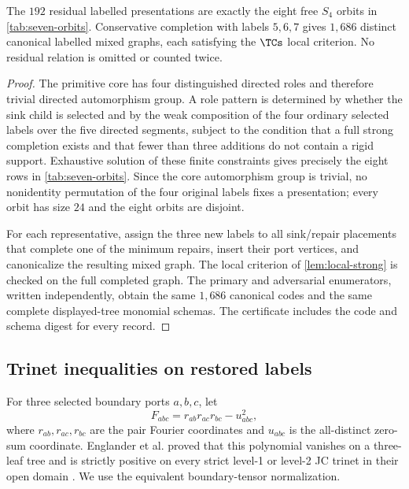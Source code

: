 \begin{proposition}\label{prop:seven-universe}
The $192$ residual labelled presentations are exactly the eight free $S_4$ orbits in \cref{tab:seven-orbits}.  Conservative completion with labels $5,6,7$ gives $1{,}686$ distinct canonical labelled mixed graphs, each satisfying the $\TCs$ local criterion.  No residual relation is omitted or counted twice.
\end{proposition}

\begin{proof}
The primitive core has four distinguished directed roles and therefore trivial directed automorphism group.  A role pattern is determined by whether the sink child is selected and by the weak composition of the four ordinary selected labels over the five directed segments, subject to the condition that a full strong completion exists and that fewer than three additions do not contain a rigid support.  Exhaustive solution of these finite constraints gives precisely the eight rows in \cref{tab:seven-orbits}.  Since the core automorphism group is trivial, no nonidentity permutation of the four original labels fixes a presentation; every orbit has size $24$ and the eight orbits are disjoint.

For each representative, assign the three new labels to all sink/repair placements that complete one of the minimum repairs, insert their port vertices, and canonicalize the resulting mixed graph.  The local criterion of \cref{lem:local-strong} is checked on the full completed graph.  The primary and adversarial enumerators, written independently, obtain the same $1{,}686$ canonical codes and the same complete displayed-tree monomial schemas.  The certificate includes the code and schema digest for every record.
\end{proof}

\subsection{Trinet inequalities on restored labels}

For three selected boundary ports $a,b,c$, let
\begin{equation}\label{eq:Fabc}
F_{abc}=r_{ab}r_{ac}r_{bc}-u_{abc}^2,
\end{equation}
where $r_{ab},r_{ac},r_{bc}$ are the pair Fourier coordinates and $u_{abc}$ is the all-distinct zero-sum coordinate.  Englander et al. proved that this polynomial vanishes on a three-leaf tree and is strictly positive on every strict level-1 or level-2 JC trinet in their open domain \cite[Proposition~2.26 in the April 2025 version]{EnglanderEtAl2025}.  We use the equivalent boundary-tensor normalization.

